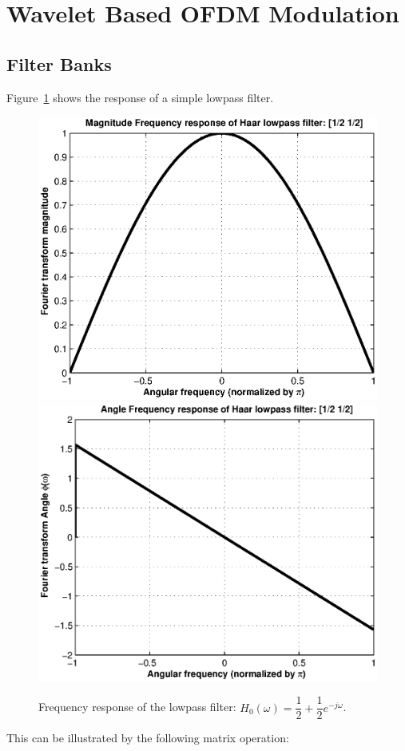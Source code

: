 	\section{Wavelet Based OFDM Modulation} \label{sec2:W-OFDM}
		\subsection{Filter Banks}
			Figure~\ref{fig2:LPF_resp} shows the response of a simple lowpass filter.
			\begin{figure}[!htbp]
				\centering
				\includegraphics[width=.6\linewidth, totalheight=6cm]{./chap_2/LPF_haar}
				\includegraphics[width=.6\linewidth, totalheight=6cm]{./chap_2/LPF_angle}
				\caption{Frequency response of the lowpass filter: $ H_0(\omega)=\dfrac{1}{2}+\dfrac{1}{2}e^{-j\omega} $.}
				\label{fig2:LPF_resp}
			\end{figure}
			This can be illustrated by the following matrix operation:
